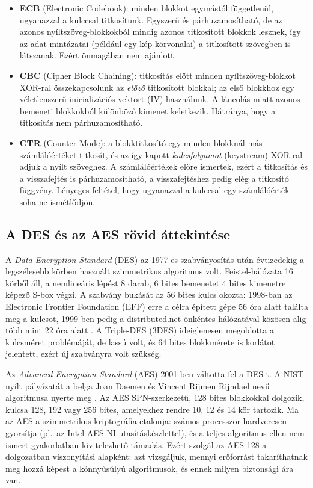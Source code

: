 \documentclass[a4paper,12pt]{report}
\theoremstyle{definition}
\theoremstyle{remark}
\begin{document}
\begin{itemize}
	\item \textbf{ECB} (Electronic Codebook): minden blokkot egymástól függetlenül, ugyanazzal a kulccsal titkosítunk. Egyszerű és párhuzamosítható, de az azonos nyíltszöveg-blokkokból mindig azonos titkosított blokkok lesznek, így az adat mintázatai (például egy kép körvonalai) a titkosított szövegben is látszanak. Ezért önmagában nem ajánlott.
	\item \textbf{CBC} (Cipher Block Chaining): titkosítás előtt minden nyíltszöveg-blokkot XOR-ral összekapcsolunk az \emph{előző} titkosított blokkal; az első blokkhoz egy véletlenszerű inicializációs vektort (IV) használunk. A láncolás miatt azonos bemeneti blokkokból különböző kimenet keletkezik. Hátránya, hogy a titkosítás nem párhuzamosítható.
	\item \textbf{CTR} (Counter Mode): a blokktitkosító egy minden blokknál más számlálóértéket titkosít, és az így kapott \emph{kulcsfolyamot} (keystream) XOR-ral adjuk a nyílt szöveghez. A számlálóértékek előre ismertek, ezért a titkosítás és a visszafejtés is párhuzamosítható, a visszafejtéshez pedig elég a titkosító függvény. Lényeges feltétel, hogy ugyanazzal a kulccsal egy számlálóérték soha ne ismétlődjön.
\end{itemize}

\subsection{A DES és az AES rövid áttekintése}

A \emph{Data Encryption Standard} (DES) az 1977-es szabványosítás után évtizedekig a legszélesebb körben használt szimmetrikus algoritmus volt. Feistel-hálózata 16 körből áll, a nemlineáris lépést 8 darab, 6 bites bemenetet 4 bites kimenetre képező S-box végzi. A szabvány bukását az 56 bites kulcs okozta: 1998-ban az Electronic Frontier Foundation (EFF) erre a célra épített gépe 56 óra alatt találta meg a kulcsot, 1999-ben pedig a distributed.net önkéntes hálózatával közösen alig több mint 22 óra alatt \cite{Paar2010}. A Triple-DES (3DES) ideiglenesen megoldotta a kulcsméret problémáját, de lassú volt, és 64 bites blokkmérete is korlátot jelentett, ezért új szabványra volt szükség.

Az \emph{Advanced Encryption Standard} (AES) 2001-ben váltotta fel a DES-t. A NIST nyílt pályázatát a belga Joan Daemen és Vincent Rijmen Rijndael nevű algoritmusa nyerte meg \cite{FIPS197}. Az AES SPN-szerkezetű, 128 bites blokkokkal dolgozik, kulcsa 128, 192 vagy 256 bites, amelyekhez rendre 10, 12 és 14 kör tartozik. Ma az AES a szimmetrikus kriptográfia etalonja: számos processzor hardveresen gyorsítja (pl.~az Intel AES-NI utasításkészlettel), és a teljes algoritmus ellen nem ismert gyakorlatban kivitelezhető támadás. Ezért szolgál az AES-128 a dolgozatban viszonyítási alapként: azt vizsgáljuk, mennyi erőforrást takaríthatnak meg hozzá képest a könnyűsúlyú algoritmusok, és ennek milyen biztonsági ára van.
\end{document}
